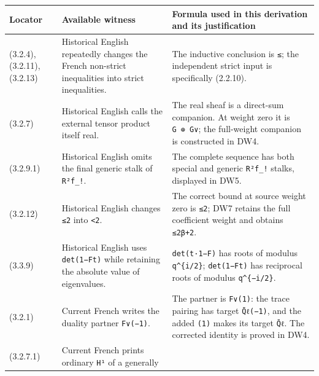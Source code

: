\documentclass[
]{report}
\newcounter{none} %
\begin{document}
{\def\LTcaptype{none} %
\begin{longtable}[]{@{}
  >{\raggedright\arraybackslash}p{}
  >{\raggedright\arraybackslash}p{}
  >{\raggedright\arraybackslash}p{}@{}}
\toprule\noalign{}
\begin{minipage}[b]{\linewidth}\raggedright
Locator
\end{minipage} & \begin{minipage}[b]{\linewidth}\raggedright
Available witness
\end{minipage} & \begin{minipage}[b]{\linewidth}\raggedright
Formula used in this derivation and its justification
\end{minipage} \\
\midrule\noalign{}
\endhead
\bottomrule\noalign{}
\endlastfoot
(3.2.4), (3.2.11), (3.2.13) & Historical English repeatedly changes the
French non-strict inequalities into strict inequalities. & The inductive
conclusion is \texttt{≤}; the independent strict input is specifically
(2.2.10). \\
(3.2.7) & Historical English calls the external tensor product itself
real. & The real sheaf is a direct-sum companion. At weight zero it is
\texttt{G\ ⊕\ G∨}; the full-weight companion is constructed in DW4. \\
(3.2.9.1) & Historical English omits the final generic stalk of
\texttt{R²f\_!}. & The complete sequence has both special and generic
\texttt{R²f\_!} stalks, displayed in DW5. \\
(3.2.12) & Historical English changes \texttt{≤2} into
\texttt{\textless{}2}. & The correct bound at source weight zero is
\texttt{≤2}; DW7 retains the full coefficient weight and obtains
\texttt{≤2β+2}. \\
(3.3.9) & Historical English uses \texttt{det(1−Ft)} while retaining the
absolute value of eigenvalues. & \texttt{det(t·1−F)} has roots of
modulus \texttt{q\^{}\{i/2\}}; \texttt{det(1−Ft)} has reciprocal roots
of modulus \texttt{q\^{}\{−i/2\}}. \\
(3.2.1) & Current French writes the duality partner \texttt{F∨(−1)}. &
The partner is \texttt{F∨(1)}: the trace pairing has target
\texttt{Q̄ℓ(−1)}, and the added \texttt{(1)} makes its target
\texttt{Q̄ℓ}. The corrected identity is proved in DW4. \\
(3.2.7.1) & Current French prints ordinary \texttt{H¹} of a generally

\end{longtable}}
\end{document}
